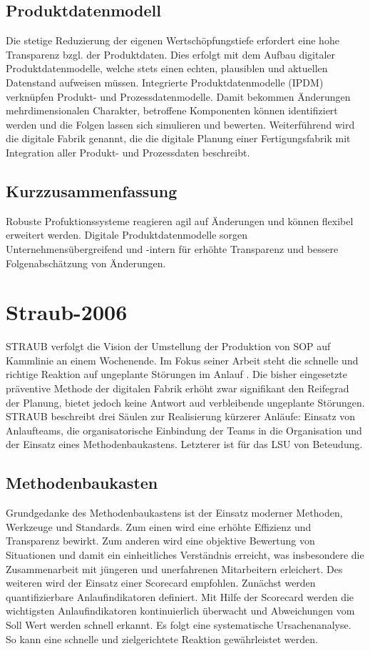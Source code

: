 \subsection{Produktdatenmodell}
Die stetige Reduzierung der eigenen Wertschöpfungstiefe erfordert eine hohe Transparenz bzgl. der Produktdaten. Dies erfolgt mit dem Aufbau digitaler Produktdatenmodelle, welche stets einen echten, plausiblen und aktuellen Datenstand aufweisen müssen. 
Integrierte Produktdatenmodelle (IPDM) %
verknüpfen Produkt- und Prozessdatenmodelle. Damit bekommen Änderungen mehrdimensionalen Charakter, betroffene Komponenten können identifiziert werden und die Folgen lassen sich simulieren und bewerten. 
Weiterführend wird die digitale Fabrik genannt, die die digitale Planung einer Fertigungsfabrik mit Integration aller Produkt- und Prozessdaten beschreibt. 

\subsection{Kurzzusammenfassung}
Robuste Profuktionssysteme reagieren agil auf Änderungen und können flexibel erweitert werden. Digitale Produktdatenmodelle sorgen Unternehmensübergreifend und -intern für erhöhte Transparenz und bessere Folgenabschätzung von Änderungen. 

\section{Straub-2006}

STRAUB verfolgt die Vision der Umstellung der Produktion von SOP %
auf Kammlinie an einem Wochenende. Im Fokus seiner Arbeit steht die schnelle und richtige Reaktion auf ungeplante Störungen im Anlauf \cite{Straub2006}. Die bisher eingesetzte präventive Methode der digitalen Fabrik erhöht zwar signifikant den Reifegrad der Planung, bietet jedoch keine Antwort aud verbleibende ungeplante Störungen. STRAUB beschreibt drei Säulen zur Realisierung kürzerer Anläufe: Einsatz von Anlaufteams, die organisatorische Einbindung der Teams in die Organisation und der Einsatz eines Methodenbaukastens. Letzterer ist für das LSU %
von Beteudung. 

\subsection{Methodenbaukasten}

Grundgedanke des Methodenbaukastens ist der Einsatz moderner Methoden, Werkzeuge und Standards.
Zum einen wird eine erhöhte Effizienz und Transparenz bewirkt. Zum anderen wird eine objektive Bewertung von Situationen und damit ein einheitliches Verständnis erreicht, was insbesondere die Zusammenarbeit mit jüngeren und unerfahrenen Mitarbeitern erleichert. 
Des weiteren wird der Einsatz einer Scorecard empfohlen. %
Zunächst werden quantifizierbare Anlaufindikatoren definiert. Mit Hilfe der Scorecard werden die wichtigsten Anlaufindikatoren kontinuierlich überwacht und Abweichungen vom Soll Wert werden schnell erkannt. Es folgt eine systematische Ursachenanalyse. So kann eine schnelle und zielgerichtete Reaktion gewährleistet werden. 
